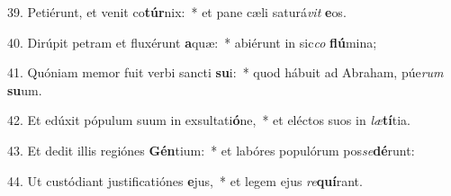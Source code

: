 39. Petiérunt, et venit co\textbf{túr}nix:~*  et pane cæli saturá\textit{vit} \textbf{e}os.\

40. Dirúpit petram et fluxérunt \textbf{a}quæ:~*  abiérunt in sic\textit{co} \textbf{flú}mina;\

41. Quóniam memor fuit verbi sancti \textbf{su}i:~*  quod hábuit ad Abraham, púe\textit{rum} \textbf{su}um.\

42. Et edúxit pópulum suum in exsultati\textbf{ó}ne,~*  et eléctos suos in \textit{læ}\textbf{tí}tia.\

43. Et dedit illis regiónes \textbf{Gén}tium:~*  et labóres populórum pos\textit{se}\textbf{dé}runt:\

44. Ut custódiant justificatiónes \textbf{e}jus,~*  et legem ejus \textit{re}\textbf{quí}rant.\

